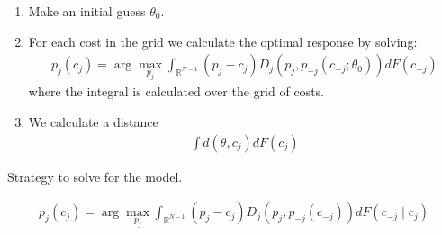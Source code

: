 \documentclass[12pt]{article}
\begin{document}
\begin{enumerate}
    \item Make an initial guess $\theta_0$. 
    \item For each cost in the grid we calculate the optimal response by solving: 
    \begin{align}
        p_j(c_j) = \arg \max_{p_j} \int_{\mathbb{R}^{N-1}}^{} (p_j - c_j) D_j(p_j, p_{-j}(c_{-j}; \theta_0)) dF(c_{-j})
    \end{align}  
    where the integral is calculated over the grid of costs. 
    \item We calculate a distance 
    \begin{align}
        \int d(\theta, c_j) dF(c_j)
    \end{align}
    
\end{enumerate}
Strategy to solve for the model. 

 
\begin{align}
\label{eq:base_equilibrium}
    p_j(c_j) = \arg \max_{p_j} \int_{\mathbb{R}^{N-1}}^{} (p_j - c_j) D_j(p_j, p_{-j}(c_{-j})) dF(c_{-j} \mid c_j)
\end{align} 
\end{document}
